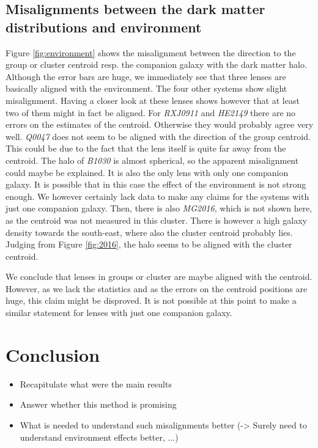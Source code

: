 \documentclass[useAMS,usenatbib]{mn2e}
\begin{document}
\subsection{Misalignments between the dark matter distributions and environment}
Figure \ref{fig:environment} shows the misalignment between the direction to the group or cluster centroid resp. the companion galaxy with the dark matter halo. Although the error bars are huge, we immediately see that three lenses are basically aligned with the environment. The four other systems show slight misalignment. Having a closer look at these lenses shows however that at least two of them might in fact be aligned. For \textit{RXJ0911} and \textit{HE2149} there are no errors on the estimates of the centroid. Otherwise they would probably agree very well. \textit{Q0047} does not seem to be aligned with the direction of the group centroid. This could be due to the fact that the lens itself is quite far away from the centroid. The halo of \textit{B1030} is almost spherical, so the apparent misalignment could maybe be explained. It is also the only lens with only one companion galaxy. It is possible that in this case the effect of the environment is not strong enough. We however certainly lack data to make any claims for the systems with just one companion galaxy. Then, there is also \textit{MG2016}, which is not shown here, as the centroid was not measured in this cluster. There is however a high galaxy density towards the south-east, where also the cluster centroid probably lies. Judging from Figure \ref{fig:2016}, the halo seems to be aligned with the cluster centroid.

We conclude that lenses in groups or cluster are maybe aligned with the centroid. However, as we lack the statistics and as the errors on the centroid positions are huge, this claim might be disproved. It is not possible at this point to make a similar statement for lenses with just one companion galaxy.


\section{Conclusion}\label{sec:conclusion}
\begin{itemize}
\item Recapitulate what were the main results
\item Answer whether this method is promising
\item What is needed to understand such misalignments better (-> Surely need to understand environment effects better, ...)
\end{itemize}
\end{document}
